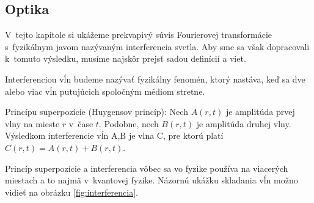 \subsection{Optika}

V~tejto kapitole si ukážeme prekvapivý súvis Fourierovej transformácie
s~fyzikálnym javom nazývaným interferencia svetla. Aby sme sa však
dopracovali k~tomuto výsledku, musíme najskôr prejsť sadou definícií a
viet.

\begin{definicia}
Interferenciou vĺn budeme nazývať fyzikálny fenomén, ktorý
nastáva, keď sa dve alebo viac vĺn putujúcich spoločným médiom
stretne.
\end{definicia}

\begin{veta}
Princípu superpozície (Huygensov princíp):
Nech $A(r,t)$ je amplitúda prvej vlny na mieste $r$ v~čase $t$.
Podobne, nech $B(r,t)$ je amplitúda druhej vlny.
Výsledkom interferencie vĺn A,B je vlna C, pre ktorú platí
 $C(r,t)=A(r,t)+B(r,t)$. 
\end{veta}

Princíp superpozície a interferencia vôbec sa vo
 fyzike používa na viacerých miestach a to najmä v~kvantovej fyzike.
Názornú ukážku skladania vĺn možno vidieť na obrázku
 \ref{fig:interferencia}.


